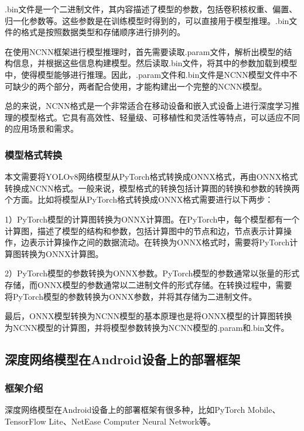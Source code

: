 \documentclass{ctexart}
\numberwithin{equation}{section}%
\numberwithin{figure}{section}%
\numberwithin{table}{section}%
\begin{document}
	.bin文件是一个二进制文件，其内容描述了模型的参数，包括卷积核权重、偏置、归一化参数等。这些参数是在训练模型时得到的，可以直接用于模型推理。.bin文件的格式是按照数据类型和存储顺序进行排列的。
	
	在使用NCNN框架进行模型推理时，首先需要读取.param文件，解析出模型的结构信息，并根据这些信息构建模型。然后读取.bin文件，将其中的参数加载到模型中，使得模型能够进行推理。因此，.param文件和.bin文件是NCNN模型文件中不可缺少的两个部分，两者配合使用，才能构建出一个完整的NCNN模型。
	
	总的来说，NCNN格式是一个非常适合在移动设备和嵌入式设备上进行深度学习推理的模型格式。它具有高效性、轻量级、可移植性和灵活性等特点，可以适应不同的应用场景和需求。
	
	\subsubsection{模型格式转换}
	本文需要将YOLOv8网络模型从PyTorch格式转换成ONNX格式，再由ONNX格式转换成NCNN格式。一般来说，模型格式的转换包括计算图的转换和参数的转换两个方面。比如将模型从PyTorch格式转换成ONNX格式需要进行以下两步：
	
	1）PyTorch模型的计算图转换为ONNX计算图。在PyTorch中，每个模型都有一个计算图，描述了模型的结构和参数，包括计算图中的节点和边，节点表示计算操作，边表示计算操作之间的数据流动。在转换为ONNX格式时，需要将PyTorch计算图转换为ONNX计算图。
	
	2）PyTorch模型的参数转换为ONNX参数。PyTorch模型的参数通常以张量的形式存储，而ONNX模型的参数通常以二进制文件的形式存储。在转换过程中，需要将PyTorch模型的参数转换为ONNX参数，并将其存储为二进制文件。
	
	最后，ONNX模型转换为NCNN模型的基本原理也是将ONNX模型的计算图转换为NCNN模型的计算图，并将模型参数转换为NCNN模型的.param和.bin文件。
	
	\subsection{深度网络模型在Android设备上的部署框架}
	\subsubsection{框架介绍}
	深度网络模型在Android设备上的部署框架有很多种，比如PyTorch Mobile、TensorFlow Lite、NetEase Computer Neural Network等。
	
\end{document}

